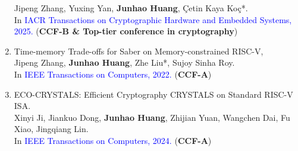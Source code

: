 \documentclass[letterpaper,11pt]{article}
\newlength{\outerbordwidth}
\newcommand{\resitem}[1]{\item #1 \vspace{-2pt}}
\newcommand{\resheading}[1]{\vspace{2pt}%
  \parbox{\textwidth}{\setlength{\FrameSep}{\outerbordwidth}
    \begin{shaded}
\setlength{\fboxsep}{0pt}\framebox[\textwidth][l]{\setlength{\fboxsep}{4pt}\fcolorbox{shadecolorB}{shadecolorB}{\textbf{\sffamily{\mbox{~}\makebox[6.762in][l]{\large #1} \vphantom{p\^{E}}}}}}
    \end{shaded}
  }\vspace{-5pt}%
}
\begin{document}
\begin{enumerate}
{		Jipeng Zhang, Yuxing Yan, \textbf{Junhao Huang}, Çetin Kaya Koç*.\\ 
		In \textcolor{blue}{IACR Transactions on Cryptographic Hardware and Embedded Systems, 2025.} (\textbf{CCF-B \& Top-tier conference in cryptography})
	}
	\item {Time-memory Trade-offs for Saber on Memory-constrained RISC-V,\\
	Jipeng Zhang, \textbf{Junhao Huang}, Zhe Liu*, Sujoy Sinha Roy. \\
	In \textcolor{blue}{IEEE Transactions on Computers, 2022.} (\textbf{CCF-A})
	}
	\item {ECO-CRYSTALS: Efficient Cryptography CRYSTALS on Standard RISC-V ISA.\\
	Xinyi Ji, Jiankuo Dong, \textbf{Junhao Huang}, Zhijian Yuan, Wangchen Dai, Fu Xiao, Jingqiang Lin.\\  In \textcolor{blue}{IEEE Transactions on Computers, 2024.} (\textbf{CCF-A})
	}
\end{enumerate}

\end{document}
